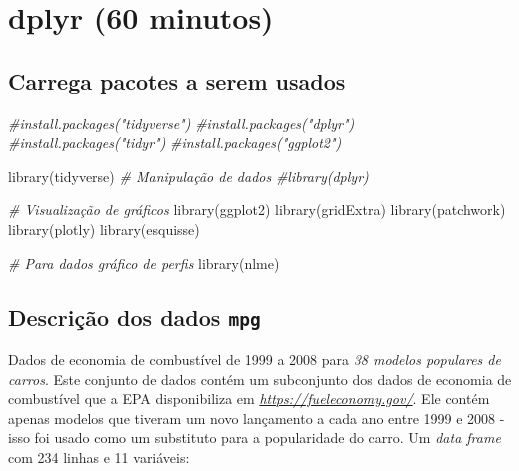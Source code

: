 \documentclass[
]{book}
\newenvironment{Shaded}{\begin{snugshade}}{\end{snugshade}}
\newcommand{\CommentTok}[1]{\textcolor[rgb]{0.56,0.35,0.01}{\textit{#1}}}
\newcommand{\FunctionTok}[1]{\textcolor[rgb]{0.00,0.00,0.00}{#1}}
\newcommand{\NormalTok}[1]{#1}
\begin{document}
\hypertarget{dplyr-60-minutos}{%
\chapter{dplyr (60 minutos)}\label{dplyr-60-minutos}}

\hypertarget{carrega-pacotes-a-serem-usados-1}{%
\section{Carrega pacotes a serem usados}\label{carrega-pacotes-a-serem-usados-1}}

\begin{Shaded}
\begin{Highlighting}[]
\CommentTok{\#install.packages("tidyverse") }
\CommentTok{\#install.packages("dplyr")     }
\CommentTok{\#install.packages("tidyr")     }
\CommentTok{\#install.packages("ggplot2")   }

\FunctionTok{library}\NormalTok{(tidyverse)}
\CommentTok{\# Manipulação de dados}
\CommentTok{\#library(dplyr)}

\CommentTok{\# Visualização de gráficos}
\FunctionTok{library}\NormalTok{(ggplot2)}
\FunctionTok{library}\NormalTok{(gridExtra)}
\FunctionTok{library}\NormalTok{(patchwork)}
\FunctionTok{library}\NormalTok{(plotly)}
\FunctionTok{library}\NormalTok{(esquisse)}

\CommentTok{\# Para dados gráfico de perfis}
\FunctionTok{library}\NormalTok{(nlme)}
\end{Highlighting}
\end{Shaded}

\hypertarget{descriuxe7uxe3o-dos-dados-mpg-1}{%
\section{\texorpdfstring{Descrição dos dados \texttt{mpg}}{Descrição dos dados mpg}}\label{descriuxe7uxe3o-dos-dados-mpg-1}}

Dados de economia de combustível de 1999 a 2008 para \emph{38 modelos populares de carros}. Este conjunto de dados contém um subconjunto dos dados de economia de combustível que a EPA disponibiliza em \emph{\url{https://fueleconomy.gov/}}. Ele contém apenas modelos que tiveram um novo lançamento a cada ano entre 1999 e 2008 - isso foi usado como um substituto para a popularidade do carro. Um \emph{data frame} com 234 linhas e 11 variáveis:
\end{document}
